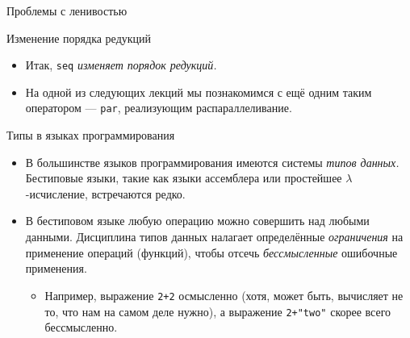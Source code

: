 \documentclass[xcolor=dvipsnames]{beamer}
\begin{document}
\begin{frame}[fragile]{Проблемы с ленивостью}

 
\end{frame}

\begin{frame}{Изменение порядка редукций}
 
 \begin{itemize}[<+->]
  \item Итак, \texttt{seq} {\em изменяет порядок редукций.}
  \item На одной из следующих лекций мы познакомимся с ещё одним таким оператором --- \texttt{par}, реализующим распараллеливание.
 \end{itemize}

\end{frame}


\begin{frame}[fragile]{Типы в языках программирования}
 
 \begin{itemize}[<+->]
  \item В большинстве языков программирования имеются системы {\em типов данных.} 
  Бестиповые языки, такие как языки ассемблера или простейшее $\lambda$-исчисление, встречаются редко.
  \item В бестиповом языке любую операцию можно совершить над любыми данными. Дисциплина типов данных налагает определённые {\em ограничения} на применение операций (функций), чтобы отсечь {\em бессмысленные} ошибочные применения.
  \begin{itemize}
    \item Например, выражение \texttt{2+2} осмысленно (хотя, может быть, вычисляет не то, что нам на самом деле нужно), а выражение \texttt{2+"two"} скорее всего бессмысленно.
  \end{itemize}
 \end{itemize}

 
\end{frame}
\end{document}
